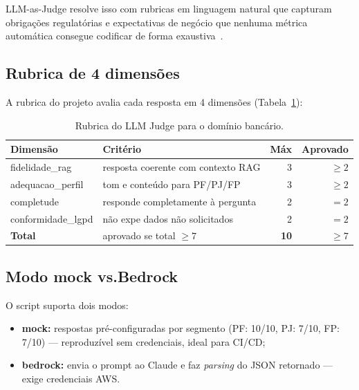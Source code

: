 LLM-as-Judge resolve isso com rubricas em linguagem natural que
capturam obriga\c{c}\~oes regulat\'orias e expectativas de neg\'ocio
que nenhuma m\'etrica autom\'atica consegue codificar de forma
exaustiva~\cite{llm_judge2023}.

\subsection{Rubrica de 4 dimens\~oes}

A rubrica do projeto avalia cada resposta em 4 dimens\~oes
(Tabela~\ref{tab:rubrica_judge}):

\begin{table}[htbp]
\centering
\caption{Rubrica do LLM Judge para o dom\'inio banc\'ario.}
\label{tab:rubrica_judge}
\begin{tabular}{llrr}
\toprule
\textbf{Dimens\~ao} & \textbf{Crit\'erio} & \textbf{M\'ax} & \textbf{Aprovado} \\
\midrule
fidelidade\_rag     & resposta coerente com contexto RAG    & 3 & $\geq 2$ \\
adequacao\_perfil   & tom e conte\'udo para PF/PJ/FP        & 3 & $\geq 2$ \\
completude          & responde completamente \`a pergunta   & 2 & $= 2$    \\
conformidade\_lgpd  & n\~ao expe dados n\~ao solicitados    & 2 & $= 2$    \\
\midrule
\textbf{Total}      & aprovado se total $\geq 7$            & \textbf{10} & \textbf{$\geq 7$} \\
\bottomrule
\end{tabular}
\end{table}

\subsection{Modo mock vs.\@ Bedrock}

O script suporta dois modos:

\begin{itemize}[leftmargin=*]
  \item \textbf{mock:} respostas pr\'e-configuradas por segmento
        (PF: 10/10, PJ: 7/10, FP: 7/10) --- reproduz\'ivel sem
        credenciais, ideal para CI/CD;
  \item \textbf{bedrock:} envia o prompt ao Claude e faz
        \textit{parsing} do JSON retornado --- exige credenciais AWS.
\end{itemize}

